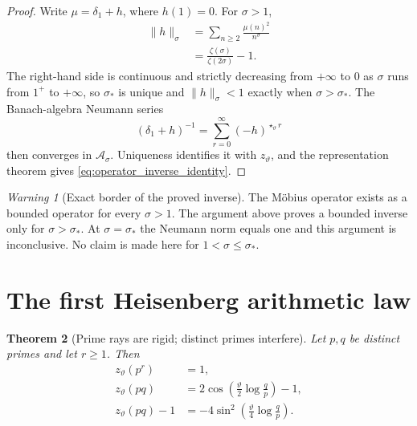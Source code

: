\documentclass[11pt]{amsart}
\numberwithin{equation}{section}
\theoremstyle{plain}
\newtheorem{theorem}{Theorem}[section]
\theoremstyle{definition}
\theoremstyle{remark}
\newtheorem{warning}[theorem]{Warning}
\newcommand{\deltaone}{\delta_{1}}
\begin{document}
\begin{proof}
Write \(\mu=\deltaone+h\), where \(h(1)=0\).  For \(\sigma>1\),
\begin{align}
\|h\|_\sigma
&=
\sum_{n\ge2}\frac{\mu(n)^2}{n^\sigma}
\label{eq:h_norm_sigma_step1}\\
&=
\frac{\zeta(\sigma)}{\zeta(2\sigma)}-1.
\label{eq:h_norm_sigma_step2}
\end{align}
The right-hand side is continuous and strictly decreasing from \(+\infty\)
to \(0\) as \(\sigma\) runs from \(1^+\) to \(+\infty\), so
\(\sigma_*\) is unique and \(\|h\|_\sigma<1\) exactly when
\(\sigma>\sigma_*\).  The Banach-algebra Neumann series
\begin{equation}
(\deltaone+h)^{-1}
=
\sum_{r=0}^{\infty}(-h)^{\star_\vartheta r}
\label{eq:neumann_inverse}
\end{equation}
then converges in \(\mathcal A_\sigma\).  Uniqueness identifies it with
\(z_\vartheta\), and the representation theorem gives
\eqref{eq:operator_inverse_identity}.
\end{proof}

\begin{warning}[Exact border of the proved inverse]
\label{warn:inverse_border}
The M\"obius operator exists as a bounded operator for every \(\sigma>1\).
The argument above proves a bounded inverse only for
\(\sigma>\sigma_*\).  At \(\sigma=\sigma_*\) the Neumann norm equals
one and this argument is inconclusive.  No claim is made here for
\(1<\sigma\le\sigma_*\).
\end{warning}

\section{The first Heisenberg arithmetic law}
\label{sec:prime_pair_interference}

\begin{theorem}[Prime rays are rigid; distinct primes interfere]
\label{thm:prime_pair_interference}
Let $p,q$ be distinct primes and let $r\ge1$.  Then
\begin{align}
z_{\vartheta}(p^r)
&=1,
\label{eq:ztheta_prime_power}\\
z_{\vartheta}(pq)
&=
2\cos\!\left(\frac{\vartheta}{2}\log\frac{q}{p}\right)-1,
\label{eq:ztheta_semiprime_cos}\\
z_{\vartheta}(pq)-1
&=
-4\sin^2\!\left(\frac{\vartheta}{4}\log\frac{q}{p}\right).
\label{eq:ztheta_semiprime_defect}
\end{align}
\end{theorem}
\end{document}

